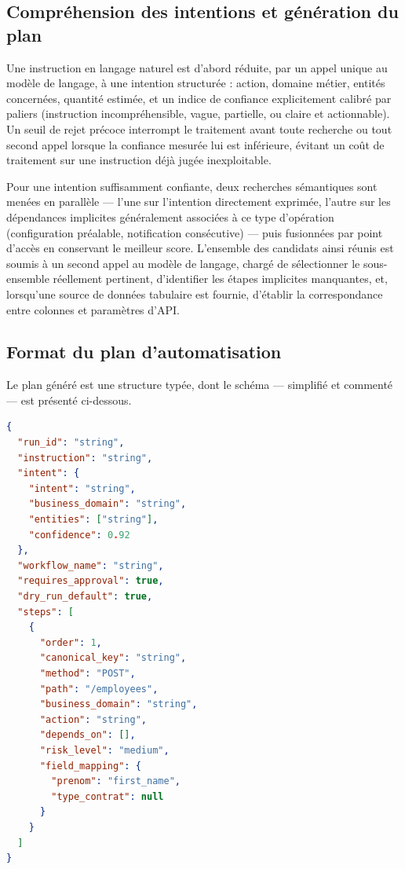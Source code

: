 \subsection{Compréhension des intentions et génération du plan}

Une instruction en langage naturel est d'abord réduite, par un appel unique au modèle de langage, à une intention structurée : action, domaine métier, entités concernées, quantité estimée, et un indice de confiance explicitement calibré par paliers (instruction incompréhensible, vague, partielle, ou claire et actionnable). Un seuil de rejet précoce interrompt le traitement avant toute recherche ou tout second appel lorsque la confiance mesurée lui est inférieure, évitant un coût de traitement sur une instruction déjà jugée inexploitable.

Pour une intention suffisamment confiante, deux recherches sémantiques sont menées en parallèle — l'une sur l'intention directement exprimée, l'autre sur les dépendances implicites généralement associées à ce type d'opération (configuration préalable, notification consécutive) — puis fusionnées par point d'accès en conservant le meilleur score. L'ensemble des candidats ainsi réunis est soumis à un second appel au modèle de langage, chargé de sélectionner le sous-ensemble réellement pertinent, d'identifier les étapes implicites manquantes, et, lorsqu'une source de données tabulaire est fournie, d'établir la correspondance entre colonnes et paramètres d'API.

\subsection{Format du plan d'automatisation}

Le plan généré est une structure typée, dont le schéma — simplifié et commenté — est présenté ci-dessous.

\begin{lstlisting}[language=json, caption={Schéma simplifié d'un plan d'automatisation}, label={lst:schema-plan}]
{
  "run_id": "string",
  "instruction": "string",
  "intent": {
    "intent": "string",
    "business_domain": "string",
    "entities": ["string"],
    "confidence": 0.92
  },
  "workflow_name": "string",
  "requires_approval": true,
  "dry_run_default": true,
  "steps": [
    {
      "order": 1,
      "canonical_key": "string",
      "method": "POST",
      "path": "/employees",
      "business_domain": "string",
      "action": "string",
      "depends_on": [],
      "risk_level": "medium",
      "field_mapping": {
        "prenom": "first_name",
        "type_contrat": null
      }
    }
  ]
}
\end{lstlisting}

